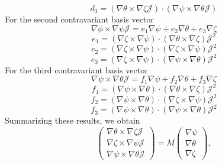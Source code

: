 \documentclass{llncs}
\begin{document}
\begin{equation}
  d_3 = (\nabla \theta \times \nabla \zeta \mathcal{J}) \cdot (\nabla \psi
  \times \nabla \theta \mathcal{J})
\end{equation}
For the second contravariant basis vector
\begin{equation}
  \nabla \phi \times \nabla \psi \mathcal{J}= e_1 \nabla \psi + e_2 \nabla
  \theta + e_3 \nabla \zeta
\end{equation}
\begin{equation}
  e_1 = (\nabla \zeta \times \nabla \psi) \cdot (\nabla \theta \times \nabla
  \zeta) \mathcal{J}^2
\end{equation}
\begin{equation}
  e_2 = (\nabla \zeta \times \nabla \psi) \cdot (\nabla \zeta \times \nabla
  \psi) \mathcal{J}^2
\end{equation}
\begin{equation}
  e_3 = (\nabla \zeta \times \nabla \psi) \cdot (\nabla \psi \times \nabla
  \theta) \mathcal{J}^2
\end{equation}
For the third contravariant basis vector
\begin{equation}
  \nabla \psi \times \nabla \theta \mathcal{J}= f_1 \nabla \psi + f_2 \nabla
  \theta + f_3 \nabla \zeta
\end{equation}
\begin{equation}
  f_1 = (\nabla \psi \times \nabla \theta) \cdot (\nabla \theta \times \nabla
  \zeta) \mathcal{J}^2
\end{equation}
\begin{equation}
  f_2 = (\nabla \psi \times \nabla \theta) \cdot (\nabla \zeta \times \nabla
  \psi) \mathcal{J}^2
\end{equation}
\begin{equation}
  f_3 = (\nabla \psi \times \nabla \theta) \cdot (\nabla \psi \times \nabla
  \theta) \mathcal{J}^2
\end{equation}
Summarizing these results, we obtain
\begin{equation}
  \label{9-5-e1m} \left(\begin{array}{c}
    \nabla \theta \times \nabla \zeta \mathcal{J}\\
    \nabla \zeta \times \nabla \psi \mathcal{J}\\
    \nabla \psi \times \nabla \theta \mathcal{J}
  \end{array}\right) = M \left(\begin{array}{c}
    \nabla \psi\\
    \nabla \theta\\
    \nabla \zeta
  \end{array}\right),
\end{equation}
\end{document}
